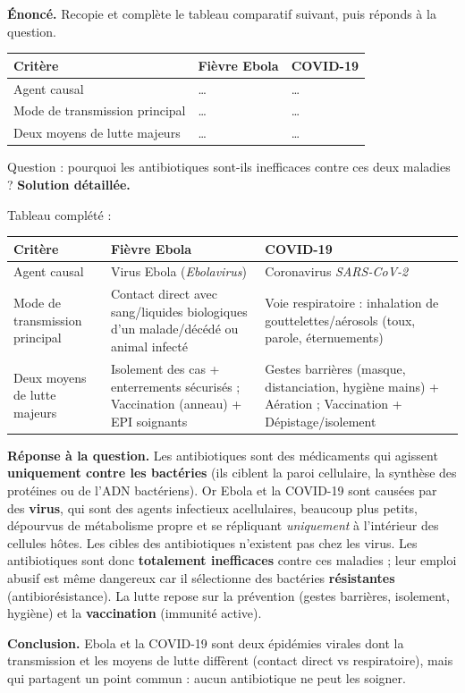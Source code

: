 \documentclass[11pt]{article}
\begin{document}
\begin{exoresolu}
\textbf{Énoncé.} Recopie et complète le tableau comparatif suivant, puis réponds à la question.

\begin{center}
\begin{tabularx}{\linewidth}{|l|X|X|}\hline
\rowcolor{popblueL} \textbf{Critère} & \textbf{Fièvre Ebola} & \textbf{COVID-19} \\ \hline
Agent causal & \ldots & \ldots \\ \hline
Mode de transmission principal & \ldots & \ldots \\ \hline
Deux moyens de lutte majeurs & \ldots & \ldots \\ \hline
\end{tabularx}
\end{center}

Question : pourquoi les antibiotiques sont-ils inefficaces contre ces deux maladies ?
\tcblower
\textbf{Solution détaillée.}

Tableau complété :
\begin{center}
\begin{tabularx}{\linewidth}{|l|X|X|}\hline
\rowcolor{popblueL} \textbf{Critère} & \textbf{Fièvre Ebola} & \textbf{COVID-19} \\ \hline
Agent causal & Virus Ebola (\emph{Ebolavirus}) & Coronavirus \emph{SARS-CoV-2} \\ \hline
Mode de transmission principal & Contact direct avec sang/liquides biologiques d'un malade/décédé ou animal infecté & Voie respiratoire : inhalation de gouttelettes/aérosols (toux, parole, éternuements) \\ \hline
Deux moyens de lutte majeurs & Isolement des cas + enterrements sécurisés ; Vaccination (anneau) + EPI soignants & Gestes barrières (masque, distanciation, hygiène mains) + Aération ; Vaccination + Dépistage/isolement \\ \hline
\end{tabularx}
\end{center}

\textbf{Réponse à la question.} Les antibiotiques sont des médicaments qui agissent \textbf{uniquement contre les bactéries} (ils ciblent la paroi cellulaire, la synthèse des protéines ou de l'ADN bactériens). Or Ebola et la COVID-19 sont causées par des \textbf{virus}, qui sont des agents infectieux acellulaires, beaucoup plus petits, dépourvus de métabolisme propre et se répliquant \emph{uniquement} à l'intérieur des cellules hôtes. Les cibles des antibiotiques n'existent pas chez les virus. Les antibiotiques sont donc \textbf{totalement inefficaces} contre ces maladies ; leur emploi abusif est même dangereux car il sélectionne des bactéries \textbf{résistantes} (antibiorésistance). La lutte repose sur la prévention (gestes barrières, isolement, hygiène) et la \textbf{vaccination} (immunité active).

\textbf{Conclusion.} Ebola et la COVID-19 sont deux épidémies virales dont la transmission et les moyens de lutte diffèrent (contact direct vs respiratoire), mais qui partagent un point commun : aucun antibiotique ne peut les soigner.
\end{exoresolu}
\end{document}
